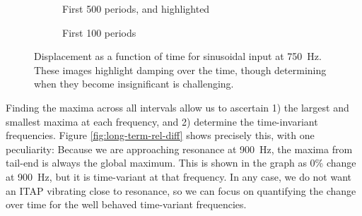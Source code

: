 \begin{figure}[h] \centering
    \begin{subfigure}{\textwidth}
    \caption{First 500 periods, and highlighted }
    \end{subfigure}
    \begin{subfigure}{\textwidth}
            \caption{First 100 periods}
        \end{subfigure}
\caption{Displacement as a function of time for sinusoidal input at \SI{750}{Hz}. These images highlight damping over the time, though determining when they become insignificant is challenging.}
\label{fig:long-term-displacement}
\end{figure}


Finding the maxima across all intervals allow us to ascertain 1) the largest and smallest maxima at each frequency, and 2) determine the time-invariant frequencies.
Figure \ref{fig:long-term-rel-diff} shows precisely this, with one peculiarity: Because we are approaching resonance at \SI{900}{Hz}, the maxima from tail-end is always the global maximum.
This is shown in the graph as 0\% change at \SI{900}{Hz}, but it is time-variant at that frequency.
In any case, we do not want an ITAP vibrating close to resonance, so we can focus on quantifying the change over time for the well behaved time-variant frequencies.


